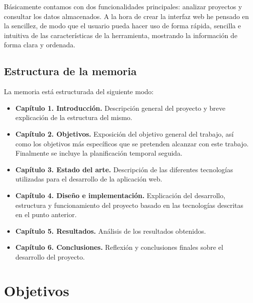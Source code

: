 \documentclass[a4paper, 12pt]{book}
\begin{document}
Básicamente contamos con dos funcionalidades principales: analizar proyectos y consultar los datos almacenados. A la hora de crear la interfaz web he pensado en la sencillez, de modo que el usuario pueda hacer uso de forma rápida, sencilla e intuitiva de las características de la herramienta, mostrando la información de forma clara y ordenada.

\section{Estructura de la memoria}
\label{sec:estructura}

La memoria está estructurada del siguiente modo:

\begin{itemize}
  \item \textbf{Capítulo 1. Introducción.} Descripción general del proyecto y breve explicación de la estructura del mismo.
  
  \item \textbf{Capítulo 2. Objetivos.} Exposición del objetivo general del trabajo, así como los objetivos más específicos que se pretenden alcanzar con este trabajo. Finalmente se incluye la planificación temporal seguida.
  
  \item \textbf{Capítulo 3. Estado del arte.} Descripción de las diferentes tecnologías utilizadas para el desarrollo de la aplicación web.
  
  \item \textbf{Capítulo 4. Diseño e implementación.} Explicación del desarrollo, estructura y funcionamiento del proyecto basado en las tecnologías descritas en el punto anterior.

  \item \textbf{Capítulo 5. Resultados.} Análisis de los resultados obtenidos.

  \item \textbf{Capítulo 6. Conclusiones.} Reflexión y conclusiones finales sobre el desarrollo del proyecto.
\end{itemize}




\cleardoublepage
\chapter{Objetivos}
\label{chap:objetivos}
\end{document}
